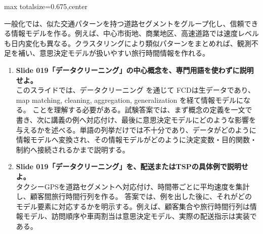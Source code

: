 \begin{adjustbox}{max totalsize={\textwidth}{0.675\textheight},center}
\begin{minipage}{\textwidth}
\begin{minipage}[t]{0.485\textwidth}
一般化では、似た交通パターンを持つ道路セグメントをグループ化し、信頼できる情報モデルを作る。例えば、中心市街地、商業地区、高速道路では速度レベルも日内変化も異なる。クラスタリングにより類似パターンをまとめれば、観測不足を補い、意思決定モデルが扱いやすい旅行時間情報を作れる。\par
{}
\begin{enumerate}
\item \textbf{Slide 019「データクリーニング」の中心概念を、専門用語を使わずに説明せよ。}\\このスライドでは、データクリーニング を通じて FCDは生データであり、map matching, cleaning, aggregation, generalization を経て情報モデルになる。 ことを理解する必要がある。試験答案では、まず概念の定義を一文で書き、次に講義の例へ対応付け、最後に意思決定モデルにどのような影響を与えるかを述べる。単語の列挙だけでは不十分であり、データがどのように情報モデルへ変換され、その情報モデルがどのように決定変数・目的関数・制約へ接続されるかまで説明する。
\item \textbf{Slide 019「データクリーニング」を、配送またはTSPの具体例で説明せよ。}\\タクシーGPSを道路セグメントへ対応付け、時間帯ごとに平均速度を集計し、顧客間旅行時間行列を作る。 答案では、例を出した後に、それがどのモデル要素に対応するかを明示する。例えば、顧客集合や旅行時間行列は情報モデル、訪問順序や車両割当は意思決定モデル、実際の配送指示は実装である。
\end{enumerate}
\end{minipage}
\end{minipage}
\end{adjustbox}

